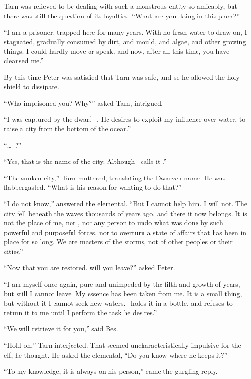 Tarn was relieved to be dealing with such a monstrous entity so amicably, but there was still the question of its loyalties. ``What are you doing in this place?''  

``I am a prisoner, trapped here for many years.  With no fresh water to draw on, I stagnated, gradually consumed by dirt, and mould, and algae, and other growing things.  I could hardly move or speak, and now, after all this time, you have cleansed me.''

By this time Peter was satisfied that Tarn was safe, and so he allowed the holy shield to dissipate.

``Who imprisoned you?  Why?''  asked Tarn, intrigued.

``I was captured by the dwarf \mothzam\ \driktur.  He desires to exploit my influence over water, to raise a city from the bottom of the ocean.''

``\ldots\ \atmudarant?''

``Yes, that is the name of the city.  Although \mothzam\ calls it \valdunmir.''

``The sunken city,'' Tarn muttered, translating the Dwarven name.  He was flabbergasted. ``What is his reason for wanting to do that?''

``I do not know,'' answered the elemental.  ``But I cannot help him.  I will not.  The city fell beneath the waves thousands of years ago, and there it now belongs.  It is not the place of me, nor \mothzam, nor any person to undo what was done by such powerful and purposeful forces, nor to overturn a state of affairs that has been in place for so long.  We are masters of the storms, not of other peoples or their cities.''

``Now that you are restored, will you leave?'' asked Peter.

``I am myself once again, pure and unimpeded by the filth and growth of years, but still I cannot leave.  My essence has been taken from me.  It is a small thing, but without it I cannot seek new waters.  \mothzam\ holds it in a bottle, and refuses to return it to me until I perform the task he desires.''

``We will retrieve it for you,'' said Bes.

``Hold on,'' Tarn interjected.  That seemed uncharacteristically impulsive for the elf, he thought.  He asked the elemental, ``Do you know where he keeps it?''

``To my knowledge, it is always on his person,'' came the gurgling reply.

